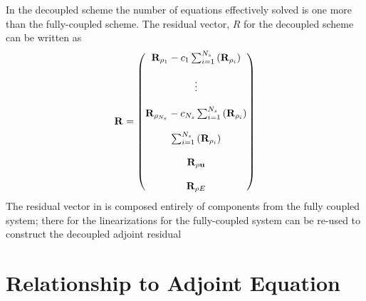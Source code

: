 In the decoupled scheme the number of equations effectively solved is one more
than the fully-coupled scheme.  The residual vector, $R$ for the decoupled
scheme can be written as
\begin{equation}
  \mathbf R_{} =
  \begin{pmatrix}
    \mathbf R_{\rho_1} - c_1 \sum_{i=1}^{N_s}\left(\mathbf R_{\rho_i}\right) \\ \\
    \vdots \\ \\
    \mathbf R_{\rho_{N_s}} - c_{N_s} \sum_{i=1}^{N_s}\left(\mathbf R_{\rho_i}\right) \\ \\
    \sum_{i=1}^{N_s}\left(\mathbf R_{\rho_i}\right) \\ \\
    \mathbf R_{\rho \mathbf u} \\ \\
    \mathbf R_{\rho E}
  \end{pmatrix}
  \label{dc-res}
\end{equation}
The residual vector in  is composed entirely of components from
the fully coupled system; there for the linearizations for the fully-coupled
system can be re-used to construct the decoupled adjoint residual

\section{Relationship to Adjoint Equation}

